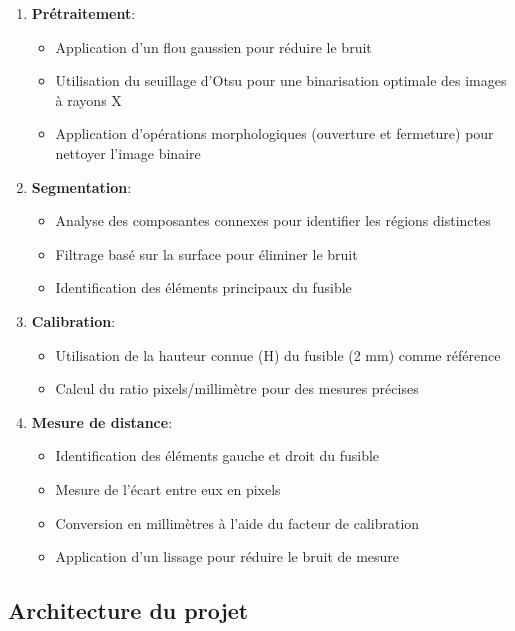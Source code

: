 \documentclass[12pt,a4paper]{article}
\begin{document}
\begin{enumerate}
    \item \textbf{Prétraitement}:
    \begin{itemize}
        \item Application d'un flou gaussien pour réduire le bruit
        \item Utilisation du seuillage d'Otsu pour une binarisation optimale des images à rayons X
        \item Application d'opérations morphologiques (ouverture et fermeture) pour nettoyer l'image binaire
    \end{itemize}
    
    \item \textbf{Segmentation}:
    \begin{itemize}
        \item Analyse des composantes connexes pour identifier les régions distinctes
        \item Filtrage basé sur la surface pour éliminer le bruit
        \item Identification des éléments principaux du fusible
    \end{itemize}
    
    \item \textbf{Calibration}:
    \begin{itemize}
        \item Utilisation de la hauteur connue (H) du fusible (2 mm) comme référence
        \item Calcul du ratio pixels/millimètre pour des mesures précises
    \end{itemize}
    
    \item \textbf{Mesure de distance}:
    \begin{itemize}
        \item Identification des éléments gauche et droit du fusible
        \item Mesure de l'écart entre eux en pixels
        \item Conversion en millimètres à l'aide du facteur de calibration
        \item Application d'un lissage pour réduire le bruit de mesure
    \end{itemize}
\end{enumerate}

\subsection{Architecture du projet}
\end{document}
